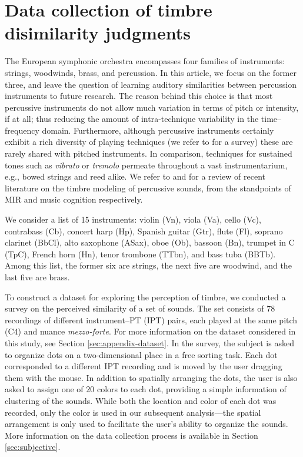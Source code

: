 \documentclass{bmcart}
\makeatletter
\newcommand*{\eg}{e.g.,\@\xspace}
\makeatother
\begin{document}


\section*{Data collection of timbre disimilarity judgments}
\label{sec:survey}

The European symphonic orchestra encompasses four families of instruments: strings, woodwinds, brass, and percussion.
In this article, we focus on the former three, and leave the question of learning auditory similarities between percussion instruments to future research.
The reason behind this choice is that most percussive instruments do not allow much variation in terms of pitch or intensity, if at all; thus reducing the amount of intra-technique variability in the time--frequency domain.
Furthermore, although percussive instruments certainly exhibit a rich diversity of playing techniques (we refer to \cite{peinkofer1976book} for a survey) these are rarely shared with pitched instruments.
In comparison, techniques for sustained tones such as \emph{vibrato} or \emph{tremolo} permeate throughout a vast instrumentarium, \eg{} bowed strings and reed alike.
We refer to \cite{x} and \cite{x} for a review of recent literature on the timbre modeling of percussive sounds, from the standpoints of MIR and music cognition respectively. %

We consider a list of 15 instruments: violin (Vn), viola (Va), cello (Vc), contrabass (Cb), concert harp (Hp), Spanish guitar (Gtr), flute (Fl), soprano clarinet (BbCl), alto saxophone (ASax), oboe (Ob), bassoon (Bn), trumpet in C (TpC), French horn (Hn), tenor trombone (TTbn), and bass tuba (BBTb). %
Among this list, the former six are strings, the next five are woodwind, and the last five are brass.



To construct a dataset for exploring the perception of timbre, we conducted a survey on the perceived similarity of a set of sounds.
The set consists of $78$ recordings of different instrument--PT (IPT) pairs, each played at the same pitch (C4) and nuance \textit{mezzo-forte}. For more information on the dataset considered in this study, see Section \ref{sec:appendix-dataset}.
In the survey, the subject is asked to organize dots on a two-dimensional place in a free sorting task.
Each dot corresponded to a different IPT recording and is moved by the user dragging them with the mouse.
In addition to spatially arranging the dots, the user is also asked to assign one of $20$ colors to each dot, providing a simple information of clustering of the sounds.
While both the location and color of each dot was recorded, only the color is used in our subsequent analysis---the spatial arrangement is only used to facilitate the user's ability to organize the sounds.
More information on the data collection process is available in  Section \ref{sec:subjective}.
\end{document}
